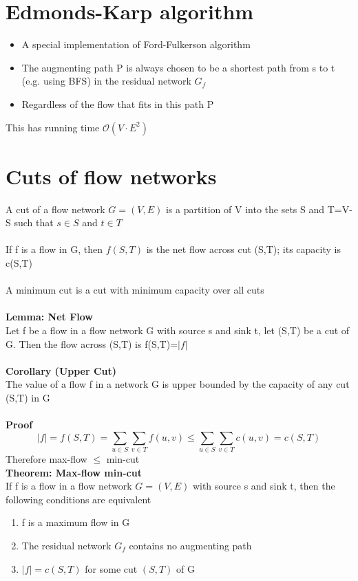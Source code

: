 \documentclass{article}[18pt]
\begin{document}
\section{Edmonds-Karp algorithm}
\begin{itemize}
	\item A special implementation of Ford-Fulkerson algorithm
	\item The augmenting path P is always chosen to be a shortest path from s to t (e.g. using BFS) in the residual network $G_f$
	\item Regardless of the flow that fits in this path P
\end{itemize}
This has running time $\mathcal{O}(V\cdot E^2)$
\section{Cuts of flow networks}
A cut of a flow network $G=(V,E)$ is a partition of V into the sets S and T=V-S such that $s\in S$ and $t\in T$\\
\\
If f is a flow in G, then $f(S,T)$ is the net flow across cut (S,T); its capacity is c(S,T)\\
\\
A minimum cut is a cut with minimum capacity over all cuts\\
\\
\textbf{Lemma: Net Flow}\\
Let f be a flow in a flow network G with source s and sink t, let (S,T) be a cut of G. Then the flow across (S,T) is f(S,T)=$|f|$\\
\\
\textbf{Corollary (Upper Cut)}\\
The value of a flow f in a network G is upper bounded by the capacity of any cut (S,T) in G\\
\\
\textbf{Proof}
\[
|f|=f(S, T)=\sum_{u \in S} \sum_{v \in T} f(u, v) \leq \sum_{u \in S} \sum_{v \in T} c(u, v)=c(S, T)
\]
Therefore max-flow $\leqslant$ min-cut\\
\textbf{Theorem: Max-flow min-cut}\\
If f is a flow in a flow network $G=(V,E)$ with source s and sink t, then the following conditions are equivalent
\begin{enumerate}
	\item f is a maximum flow in G
	\item The residual network $G_f$ contains no augmenting path
	\item $|f|=c(S,T)$ for some cut $(S,T)$ of G
\end{enumerate} 
\end{document}
